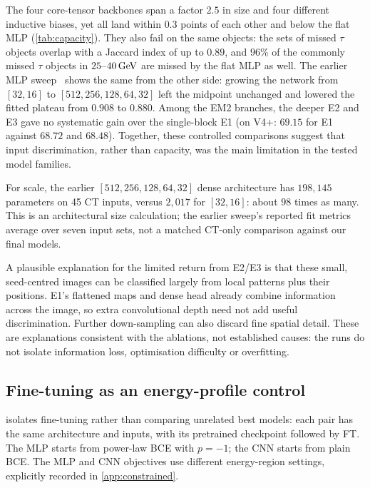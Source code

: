 \begin{table}[ht]
  \centering
  \caption{Capacity study. Upper block: global efficiencies for our CT-only, IF-trained, NN-only models. Lower block: prior-work fitted midpoint [GeV] and plateau, averaged over seven input sets~\cite{kernan2026}. Model-name key: \cref{tab:naming}.}
  \label{tab:capacity}
  \small
  
\end{table}

The four core-tensor backbones span a factor $2.5$ in size and four different inductive biases, yet all land within $0.3$ points of each other and below the flat MLP (\cref{tab:capacity}). They also fail on the same objects: the sets of missed $\tau$ objects overlap with a Jaccard index of up to $0.89$, and $96\%$ of the commonly missed $\tau$ objects in $25$--$40\,\mathrm{GeV}$ are missed by the flat MLP as well. The earlier MLP sweep~\cite{kernan2026} shows the same from the other side: growing the network from $[32,16]$ to $[512,256,128,64,32]$ left the midpoint unchanged and lowered the fitted plateau from $0.908$ to $0.880$. Among the EM2 branches, the deeper E2 and E3 gave no systematic gain over the single-block E1 (on V4+\Ffeat: $69.15$ for E1 against $68.72$ and $68.48$). Together, these controlled comparisons suggest that input discrimination, rather than capacity, was the main limitation in the tested model families.

For scale, the earlier $[512,256,128,64,32]$ dense architecture has $198{,}145$ parameters on 45 CT inputs, versus $2{,}017$ for $[32,16]$: about $98$ times as many. This is an architectural size calculation; the earlier sweep's reported fit metrics average over seven input sets, not a matched CT-only comparison against our final models.

A plausible explanation for the limited return from E2/E3 is that these small, seed-centred images can be classified largely from local patterns plus their positions. E1's flattened maps and dense head already combine information across the image, so extra convolutional depth need not add useful discrimination. Further down-sampling can also discard fine spatial detail. These are explanations consistent with the ablations, not established causes: the runs do not isolate information loss, optimisation difficulty or overfitting.

\subsection{Fine-tuning as an energy-profile control}
\label{app:analysis_loss}
 isolates fine-tuning rather than comparing unrelated best models: each pair has the same architecture and inputs, with its pretrained checkpoint followed by FT. The MLP starts from power-law BCE with $p=-1$; the CNN starts from plain BCE. The MLP and CNN objectives use different energy-region settings, explicitly recorded in \cref{app:constrained}.

